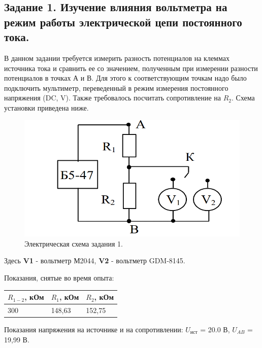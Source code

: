 \documentclass[a4paper,12pt]{article}
\begin{document}
\subsection{Задание 1. Изучение влияния вольтметра на режим работы
электрической цепи постоянного тока.}

\hspace{\parindent}В данном задании требуется измерить разность потенциалов на клеммах источника тока и сравнить ее со значением, полученным при измерении разности потенциалов в точках А и В. Для этого к соответствующим точкам надо было подключить мультиметр, переведенный в режим измерения постоянного напряжения (DC, V). Также требовалось посчитать сопротивление на $R_2$. Схема установки приведена ниже.

\begin{figure}[h!]
	\begin{center}
		\includegraphics[scale=0.6]{scheme_1.png}
	\end{center}
	\caption{Электрическая схема задания 1.}
\end{figure}
Здесь \textbf{V1} - вольтметр М2044, \textbf{V2} - вольтметр GDM-8145.

Показания, снятые во время опыта:

\begin{table}[h!]
    \centering
    \begin{tabular}{|l|l|l|}
        \hline
        $R_{1-2}$, кОм & $R_1$, кОм & $R_2$, кОм \\ \hline
        300 & 148,63 & 152,75 \\ \hline
    \end{tabular}
\end{table}

Показания напряжения на источнике и на сопротивлении: $U_{ист}$ = 20.0 В, $U_{AB}$ = 19,99 В.
\end{document}

